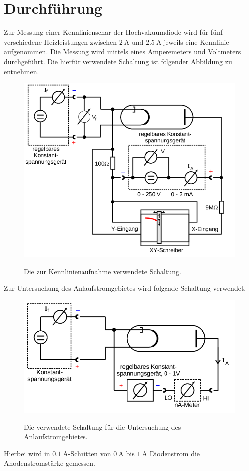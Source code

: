 \section{Durchführung}
\label{sec:Durchführung}
Zur Messung einer Kennlinienschar der Hochvakuumdiode wird für fünf
verschiedene Heizleistungen zwischen $\SI{2}{\ampere}$ und $\SI{2.5}{\ampere}$
jeweils eine Kennlinie aufgenommen. Die Messung wird mittels eines Amperemeters
und Voltmeters durchgeführt. Die hierfür verwendete Schaltung ist folgender
Abbildung zu entnehmen.
\begin{figure}[H]
  \centering
  \includegraphics[scale=0.5]{content/schaltungkennlinie.png}
  \label{fig:schaltungkennlinie}
  \caption{Die zur Kennlinienaufnahme verwendete Schaltung. \cite{AP01}}
\end{figure}
\noindent
Zur Untersuchung des Anlaufstromgebietes wird folgende Schaltung verwendet.
\begin{figure}[H]
  \centering
  \includegraphics[scale=0.5]{content/schaltunganlaufstromgebiet.png}
  \label{fig:schaltunganlaufstrom}
  \caption{Die verwendete Schaltung für die Untersuchung des Anlaufstromgebietes.\cite{AP01}}
\end{figure}
\noindent
Hierbei wird in $\SI{0.1}{\ampere}$-Schritten von $\SI{0}{\ampere}$ bis
$\SI{1}{\ampere}$ Diodenstrom die Anodenstromstärke gemessen.
